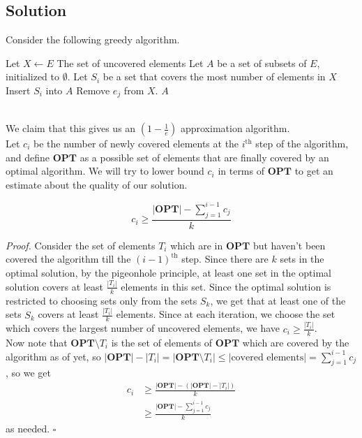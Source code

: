 \documentclass[a4paper]{article}
\newenvironment{proof}{\begin{breakbox}\textit{Proof.}}{\hfill$\square$\end{breakbox}}
\newcommand{\nl}{\vspace{0.2cm}\\}
\newcommand{\OPT}{\mathbf{OPT}}
\begin{document}
\subsection{Solution}

Consider the following greedy algorithm.
\begin{algorithmic}[1]
        \State Let $X \gets E$ \Comment The set of uncovered elements
        \State Let $A$ be a set of subsets of $E$, initialized to $\emptyset$.
            \State Let $S_i$ be a set that covers the most number of elements in $X$
            \State Insert $S_i$ into $A$
                    \State Remove $e_j$ from $X$.
                \EndIf
            \EndFor
        \EndFor
        \State \Return $A$
    \EndFunction
\end{algorithmic}
\nl
We claim that this gives us an $\left(1 - \frac{1}{e}\right)$ approximation algorithm.\nl
Let $c_i$ be the number of newly covered elements at the $i^\mathrm{th}$ step of the algorithm, and define $\OPT$ as a possible set of elements that are finally covered by an optimal algorithm.
We will try to lower bound $c_i$ in terms of $\OPT$ to get an estimate about the quality of our solution. \nl

\begin{claim}
    $$c_i \ge \frac{|\OPT| - \sum_{j = 1}^{i - 1} c_j}{k}$$
\end{claim}

\begin{proof}
Consider the set of elements $T_i$ which are in $\OPT$ but haven't been covered the algorithm till the $(i - 1)^\mathrm{th}$ step. Since there are $k$ sets in the optimal solution, by the pigeonhole
    principle, at least one set in the optimal solution covers at least $\frac{|T_i|}{k}$ elements in this set. Since the optimal solution is restricted to choosing sets only from the
    sets $S_k$, we get that at least one of the sets $S_k$ covers at least $\frac{|T_i|}{k}$ elements. Since at each iteration, we choose the set which covers the largest number of
uncovered elements, we have $c_i \ge \frac{|T_i|}{k}$.\nl
Now note that $\OPT \setminus T_i$ is the set of elements of $\OPT$ which are covered by the algorithm as of yet, so $|\OPT| - |T_i| = |\OPT \setminus T_i| \le |\text{covered elements}| = \sum_{j =
1}^{i - 1} c_j$, so we get
\begin{align*}
    c_i &\ge \frac{|\OPT| - (|\OPT| - |T_i|)}{k}\\
        &\ge \frac{|\OPT| - \sum_{j = 1}^{i - 1} c_j}{k}
\end{align*}
as needed.
\end{proof}
\end{document}
